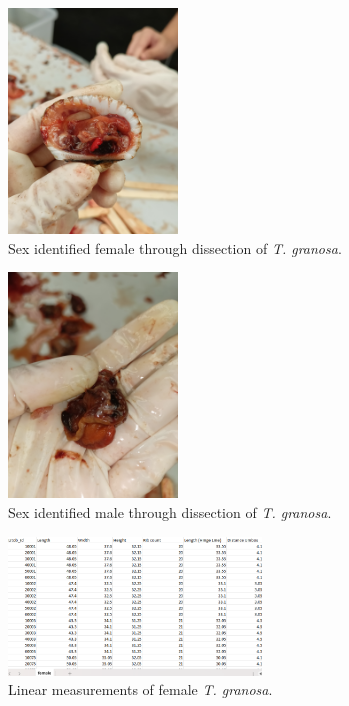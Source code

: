 \begin{figure}[!htbp]
	\centering
	\includegraphics[width=0.4\textwidth, angle=90]{figures/dissecting_female.jpg}
	\caption{Sex identified female through dissection of \textit{T. granosa}.}
\end{figure}

\begin{figure}[!htbp]
	\centering
	\includegraphics[width=0.4\textwidth, angle=90]{figures/dissecting male.jpg}
	\caption{Sex identified male through dissection of \textit{T. granosa}.}
\end{figure}

\begin{figure}[!htbp]
	\centering
	\includegraphics[width=0.6\textwidth]{figures/female_dataset.png}
	\caption{Linear measurements of female \textit{T. granosa}.}
\end{figure}

